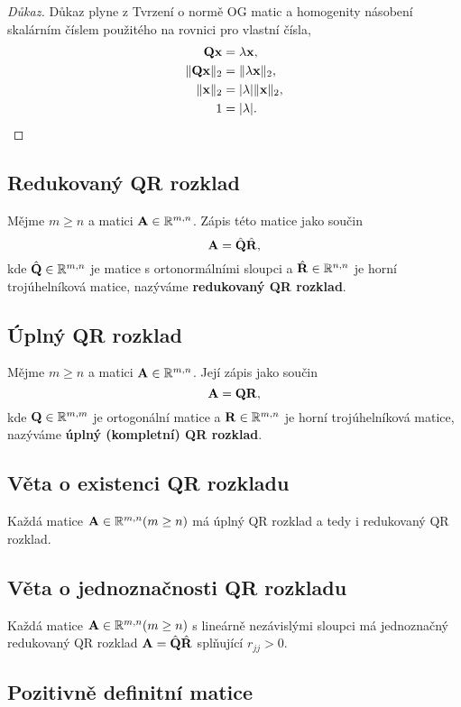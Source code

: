 \begin{proof}[Důkaz]
	Důkaz plyne z Tvrzení o normě OG matic a homogenity násobení skalárním číslem použitého na rovnici pro vlastní čísla,
	\begin{align*}
		\mathbf{Q} \mathbf{x} &= \lambda \mathbf{x},\\
		\|\mathbf{Q} \mathbf{x}\|_2 &= \|\lambda \mathbf{x}\|_2,\\
		\|\mathbf{x}\|_2 &= |\lambda| \|\mathbf{x}\|_2,\\
		1 &= |\lambda|.
	\end{align*}
\end{proof}

\subsection*{Redukovaný QR rozklad}

Mějme $m\geq n$ a matici $\mathbf{A} \in \mathbb{R}^{m,n}$. Zápis této matice jako součin
\[ \mathbf{A} = \hat{\mathbf{Q}}\hat{\mathbf{R}}, \]
kde $\hat{\mathbf{Q}} \in \mathbb{R}^{m,n}$ je matice s ortonormálními sloupci a $\hat{\mathbf{R}} \in \mathbb{R}^{n,n}$ je horní trojúhelníková matice, nazýváme \textbf{redukovaný QR rozklad}.

\subsection*{Úplný QR rozklad}

Mějme $m\geq n$ a matici $\mathbf{A} \in \mathbb{R}^{m,n}$. Její zápis jako součin
\[ \mathbf{A} = \mathbf{Q} \mathbf{R}, \]
kde $\mathbf{Q} \in \mathbb{R}^{m,m}$ je ortogonální matice a $\mathbf{R} \in \mathbb{R}^{m,n}$ je horní trojúhelníková matice, nazýváme \textbf{úplný (kompletní) QR rozklad}.

\subsection*{Věta o existenci QR rozkladu}

Každá matice $\mathbf{A} \in \mathbb{R}^{m,n} (m \ge n)$ má úplný QR rozklad a tedy i redukovaný QR rozklad.

\subsection*{Věta o jednoznačnosti QR rozkladu}

Každá matice $\mathbf{A} \in \mathbb{R}^{m,n} (m \ge n)$ s lineárně nezávislými sloupci má jednoznačný redukovaný QR rozklad $\mathbf{A}=\hat{\mathbf{Q}}\hat{\mathbf{R}}$ splňující $r_{jj} > 0$.

\subsection*{Pozitivně definitní matice}

